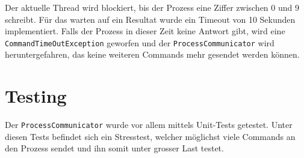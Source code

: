 Der aktuelle Thread wird blockiert, bis der Prozess eine Ziffer zwischen 0 und 9 schreibt. Für das warten auf ein Resultat wurde ein Timeout von 10 Sekunden implementiert. Falls der Prozess in dieser Zeit keine Antwort gibt, wird eine \\ \verb!CommandTimeOutException! geworfen und der \verb!ProcessCommunicator! wird heruntergefahren, das keine weiteren Commands mehr gesendet werden können.

\section{Testing}
Der \verb!ProcessCommunicator! wurde vor allem mittels Unit-Tests getestet. Unter diesen Tests befindet sich ein Stresstest, welcher möglichst viele Commands an den Prozess sendet und ihn somit unter grosser Last testet.

